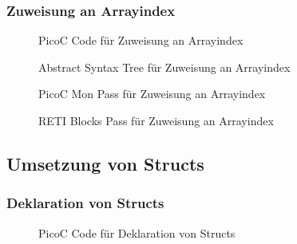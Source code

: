 \subsubsection{Zuweisung an Arrayindex}
\begin{figure}[H]
  \centering
  \caption{PicoC Code für Zuweisung an Arrayindex}
  \label{fig:picoc_code_für_array_assignment}
\end{figure}

\begin{figure}[H]
  \centering
  \caption{Abstract Syntax Tree für Zuweisung an Arrayindex}
  \label{fig:abstract_syntax_tree_für_array_assignment}
\end{figure}

\begin{figure}[H]
  \centering
  \caption{PicoC Mon Pass für Zuweisung an Arrayindex}
  \label{fig:picoc_mon_für_array_assignment}
\end{figure}

\begin{figure}[H]
  \centering
  \caption{RETI Blocks Pass für Zuweisung an Arrayindex}
  \label{fig:reti_blocks_für_array_assignment}
\end{figure}

\subsection{Umsetzung von Structs}
\subsubsection{Deklaration von Structs}
\begin{figure}[H]
  \centering
  \caption{PicoC Code für Deklaration von Structs}
  \label{fig:picoc_code_für_deklaration_von_structs}
\end{figure}

{
  \centering
  \label{fig:symboltabelle_für_deklaration_von_structs}
}

